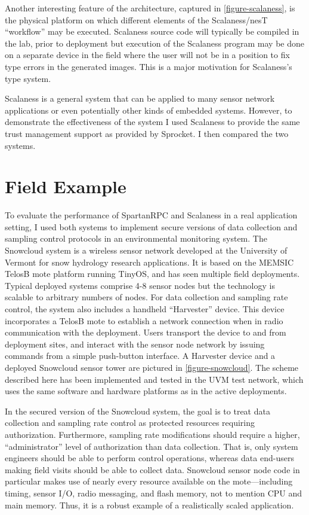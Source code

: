 Another interesting feature of the architecture, captured in \autoref{figure-scalaness}, is the
physical platform on which different elements of the Scalaness/nesT ``workflow'' may be
executed. Scalaness source code will typically be compiled in the lab, prior to deployment but
execution of the Scalaness program may be done on a separate device in the field where the user
will not be in a position to fix type errors in the generated images. This is a major motivation
for Scalaness's type system.

Scalaness is a general system that can be applied to many sensor network applications or even
potentially other kinds of embedded systems. However, to demonstrate the effectiveness of the
system I used Scalaness to provide the same trust management support as provided by Sprocket. I
then compared the two systems.

\section{Field Example}

To evaluate the performance of SpartanRPC and Scalaness in a real application setting, I used
both systems to implement secure versions of data collection and sampling control protocols in
an environmental monitoring system. The Snowcloud system
\cite{frolik-skalka-snowcloudtr,moeser-walker-skalka-frolik-wsc11} is a wireless sensor network
developed at the University of Vermont for snow hydrology research applications. It is based on
the MEMSIC TelosB mote platform running TinyOS, and has seen multiple field deployments. Typical
deployed systems comprise 4-8 sensor nodes but the technology is scalable to arbitrary numbers
of nodes. For data collection and sampling rate control, the system also includes a handheld
``Harvester'' device. This device incorporates a TelosB mote to establish a network connection
when in radio communication with the deployment. Users transport the device to and from
deployment sites, and interact with the sensor node network by issuing commands from a simple
push-button interface. A Harvester device and a deployed Snowcloud sensor tower are pictured in
\autoref{figure-snowcloud}. The scheme described here has been implemented and tested in the UVM
test network, which uses the same software and hardware platforms as in the active deployments.

\snowcloudfig

In the secured version of the Snowcloud system, the goal is to treat data collection and
sampling rate control as protected resources requiring authorization. Furthermore, sampling rate
modifications should require a higher, ``administrator'' level of authorization than data
collection. That is, only system engineers should be able to perform control operations, whereas
data end-users making field visits should be able to collect data. Snowcloud sensor node code in
particular makes use of nearly every resource available on the mote---including timing, sensor
I/O, radio messaging, and flash memory, not to mention CPU and main memory. Thus, it is a robust
example of a realistically scaled application.

